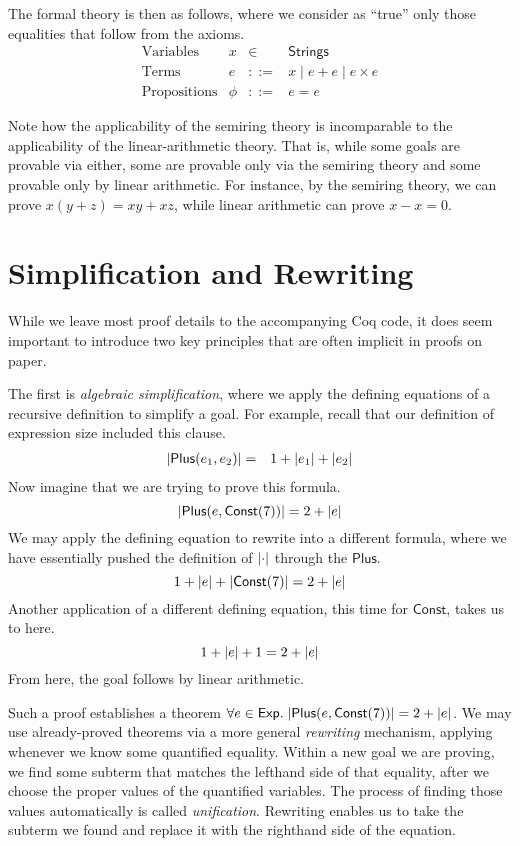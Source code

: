\documentclass{amsbook}
\theoremstyle{definition}
\theoremstyle{remark}
\numberwithin{section}{chapter}
\numberwithin{equation}{chapter}
\begin{document}
The formal theory is then as follows, where we consider as ``true'' only those equalities that follow from the axioms.
$$\begin{array}{rrcl}
  \textrm{Variables} & x &\in& \mathsf{Strings} \\
  \textrm{Terms} & e &::=& x \mid e + e \mid e \times e \\
  \textrm{Propositions} & \phi &::=& e = e
\end{array}$$

Note how the applicability of the semiring theory is incomparable to the applicability of the linear-arithmetic theory.
That is, while some goals are provable via either, some are provable only via the semiring theory and some provable only by linear arithmetic.
For instance, by the semiring theory, we can prove $x(y + z) = xy + xz$, while linear arithmetic can prove $x - x = 0$.

\section{Simplification and Rewriting}

While we leave most proof details to the accompanying Coq code, it does seem important to introduce two key principles that are often implicit in proofs on paper.

The first is \emph{algebraic simplification}, where we apply the defining equations of a recursive definition to simplify a goal.
For example, recall that our definition of expression size included this clause.
\begin{eqnarray*}
  {\left \lvert \mathsf{Plus}(e_1, e_2) \right \rvert} &=& 1 + {\left \lvert e_1 \right \rvert} + {\left \lvert e_2 \right \rvert}
\end{eqnarray*}
Now imagine that we are trying to prove this formula.
$${\left \lvert \mathsf{Plus}(e, \mathsf{Const}(7)) \right \rvert} = 2 + {\left \lvert e \right \rvert}$$
We may apply the defining equation to rewrite into a different formula, where we have essentially pushed the definition of ${\left \lvert \cdot \right \rvert}$ through the $\mathsf{Plus}$.
$$1 + {\left \lvert e \right \rvert} + {\left \lvert \mathsf{Const}(7) \right \rvert} = 2 + {\left \lvert e \right \rvert}$$
Another application of a different defining equation, this time for $\mathsf{Const}$, takes us to here.
$$1 + {\left \lvert e \right \rvert} + 1 = 2 + {\left \lvert e \right \rvert}$$
From here, the goal follows by linear arithmetic.

\medskip

Such a proof establishes a theorem $\forall e \in \mathsf{Exp}. \; {\left \lvert \mathsf{Plus}(e, \mathsf{Const}(7)) \right \rvert} = 2 + {\left \lvert e \right \rvert}$.
We may use already-proved theorems via a more general \emph{rewriting} mechanism, applying whenever we know some quantified equality.
Within a new goal we are proving, we find some subterm that matches the lefthand side of that equality, after we choose the proper values of the quantified variables.
The process of finding those values automatically is called \emph{unification}.
Rewriting enables us to take the subterm we found and replace it with the righthand side of the equation.
\end{document}
